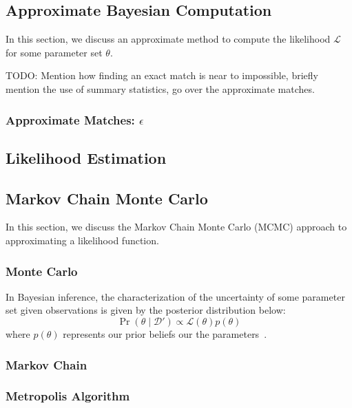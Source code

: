 \subsection{Approximate Bayesian Computation}\label{subsec:abc}
In this section, we discuss an approximate method to compute the likelihood $\mathcal{L}$ for some parameter set
$\theta$.


TODO: Mention how finding an exact match is near to impossible, briefly mention the use of summary statistics,
go over the approximate matches.

\subsubsection{Approximate Matches: $\epsilon$}

\subsection{Likelihood Estimation}\label{subsec:le}

\subsection{Markov Chain Monte Carlo}\label{subsec:mcmc}
In this section, we discuss the Markov Chain Monte Carlo (MCMC) approach to approximating a likelihood function.

\subsubsection{Monte Carlo}
In Bayesian inference, the characterization of the uncertainty of some parameter set given observations is given by
the posterior distribution below:
\begin{equation}
    \Pr(\theta \mid \mathcal{D}') \propto \mathcal{L}(\theta) p(\theta)
\end{equation}
where $p(\theta)$ represents our prior beliefs our the parameters~\cite{liepeABCSysBioApproximateBayesian2010}.

\subsubsection{Markov Chain}

\subsubsection{Metropolis Algorithm}